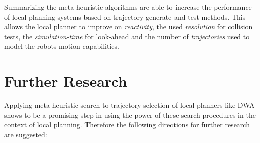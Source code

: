 Summarizing the meta-heuristic algorithms are able to increase the performance of local planning systems based on trajectory generate and test methods. 
This allows the local planner to improve on \emph{reactivity}, the used \emph{resolution} for collision tests, the \emph{simulation-time} for look-ahead and the number of \emph{trajectories} used to model the robots motion capabilities.

\section{Further Research}
Applying meta-heuristic search to trajectory selection of local planners like DWA shows to be a promising step in using the power of these search procedures in the context of local planning. 
Therefore the following directions for further research are suggested:

